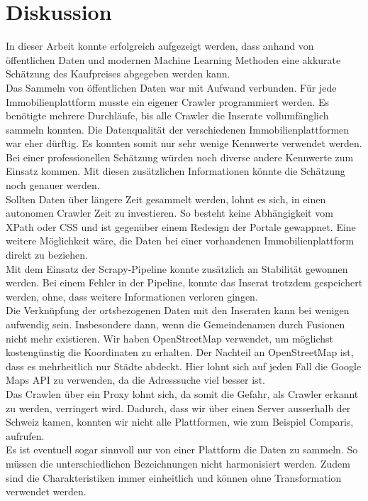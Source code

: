 \section{Diskussion}
In dieser Arbeit konnte erfolgreich aufgezeigt werden, dass anhand von öffentlichen Daten und modernen Machine Learning Methoden eine akkurate Schätzung des Kaufpreises abgegeben werden kann.\\[2ex]
%
Das Sammeln von öffentlichen Daten war mit Aufwand verbunden. Für jede Immobilienplattform musste ein eigener Crawler programmiert werden. Es benötigte mehrere Durchläufe, bis alle Crawler die Inserate vollumfänglich sammeln konnten. Die Datenqualität der verschiedenen Immobilienplattformen war eher dürftig. Es konnten somit nur sehr wenige Kennwerte verwendet werden. Bei einer professionellen Schätzung würden noch diverse andere Kennwerte zum Einsatz kommen. Mit diesen zusätzlichen Informationen könnte die Schätzung noch genauer werden.\\
Sollten Daten über längere Zeit gesammelt werden, lohnt es sich, in einen autonomen Crawler Zeit zu investieren. So besteht keine Abhängigkeit vom XPath oder CSS und ist gegenüber einem Redesign der Portale gewappnet. Eine weitere Möglichkeit wäre, die Daten bei einer vorhandenen Immobilienplattform direkt zu beziehen.\\
Mit dem Einsatz der Scrapy-Pipeline konnte zusätzlich an Stabilität gewonnen werden. Bei einem Fehler in der Pipeline, konnte das Inserat trotzdem gespeichert werden, ohne, dass weitere Informationen verloren gingen.\\
%
Die Verknüpfung der ortsbezogenen Daten mit den Inseraten kann bei wenigen aufwendig sein. Insbesondere dann, wenn die Gemeindenamen durch Fusionen nicht mehr existieren. Wir haben OpenStreetMap verwendet, um möglichst kostengünstig die Koordinaten zu erhalten. Der Nachteil an OpenStreetMap ist, dass es mehrheitlich nur Städte abdeckt. Hier lohnt sich auf jeden Fall die Google Maps API zu verwenden, da die Adresssuche viel besser ist.\\[2ex]
%
Das Crawlen über ein Proxy lohnt sich, da somit die Gefahr, als Crawler erkannt zu werden, verringert wird. Dadurch, dass wir über einen Server ausserhalb der Schweiz kamen, konnten wir nicht alle Plattformen, wie zum Beispiel Comparis, aufrufen.\\
Es ist eventuell sogar sinnvoll nur von einer Plattform die Daten zu sammeln. So müssen die unterschiedlichen Bezeichnungen nicht harmonisiert werden. Zudem sind die Charakteristiken immer einheitlich und können ohne Transformation verwendet werden.

